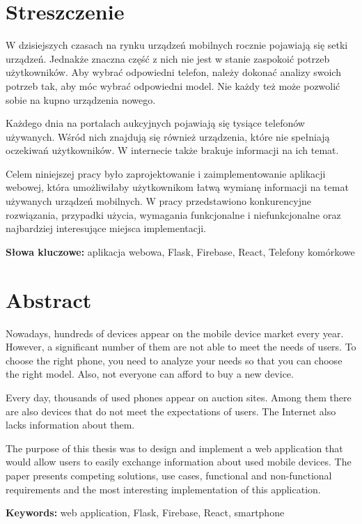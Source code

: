 \section*{Streszczenie}
W dzisiejszych czasach na rynku urządzeń mobilnych rocznie pojawiają się setki urządzeń. Jednakże znaczna część z nich nie jest w stanie zaspokoić potrzeb użytkowników. Aby wybrać odpowiedni telefon, należy dokonać analizy swoich potrzeb tak, aby móc wybrać odpowiedni model. Nie każdy też może pozwolić sobie na kupno urządzenia nowego.

Każdego dnia na portalach aukcyjnych pojawiają się tysiące telefonów używanych. Wśród nich znajdują się również urządzenia, które nie spełniają oczekiwań użytkowników. W internecie także brakuje informacji na ich temat.

Celem niniejszej pracy było zaprojektowanie i zaimplementowanie aplikacji webowej, która umożliwiłaby użytkownikom łatwą wymianę informacji na temat używanych urządzeń mobilnych. W pracy przedstawiono konkurencyjne rozwiązania, przypadki użycia, wymagania funkcjonalne i niefunkcjonalne oraz najbardziej interesujące miejsca implementacji.

\textbf{Słowa kluczowe:} aplikacja webowa, Flask, Firebase, React, Telefony komórkowe

\section*{Abstract}
Nowadays, hundreds of devices appear on the mobile device market every year. However, a significant number of them are not able to meet the needs of users. To choose the right phone, you need to analyze your needs so that you can choose the right model. Also, not everyone can afford to buy a new device.

Every day, thousands of used phones appear on auction sites. Among them there are also devices that do not meet the expectations of users. The Internet also lacks information about them.  

The purpose of this thesis was to design and implement a web application that would allow users to easily exchange information about used mobile devices. The paper presents competing solutions, use cases, functional and non-functional requirements and the most interesting implementation of this application.

\textbf{Keywords:} web application, Flask, Firebase, React, smartphone
